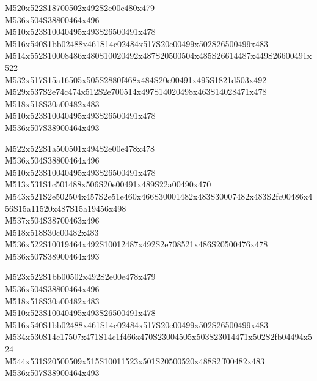 \documentclass{article}
\begin{document}
\begin{multicols}{5}
\begin{center}

M520x522S18700502x492S2e00e480x479 %
\\M536x504S38800464x496 %
\\M510x523S10040495x493S26500491x478 %
\\M516x540S1bb02488x461S14c02484x517S20e00499x502S26500499x483 %
\\M514x552S10008486x480S10020492x487S20500504x485S26614487x449S26600491x522 %
\\M532x517S15a16505x505S2880f468x484S20e00491x495S1821d503x492 %
\\M529x537S2e74c474x512S2e700514x497S14020498x463S14028471x478 %
\\M518x518S30a00482x483 %
\\M510x523S10040495x493S26500491x478 %
\\M536x507S38900464x493 %
\vfil
\columnbreak

M522x522S1a500501x494S2e00e478x478 %
\\M536x504S38800464x496 %
\\M510x523S10040495x493S26500491x478 %
\\M513x531S1c501488x506S20e00491x489S22a00490x470 %
\\M543x521S2e502504x457S2e51e460x466S30001482x483S30007482x483S2fc00486x456S15a11520x487S15a19456x498 %
\\M537x504S38700463x496 %
\\M518x518S30c00482x483 %
\\M536x522S10019464x492S10012487x492S2e708521x486S20500476x478 %
\\M536x507S38900464x493 %
\vfil
\columnbreak

M523x522S1bb00502x492S2e00e478x479 %
\\M536x504S38800464x496 %
\\M518x518S30a00482x483 %
\\M510x523S10040495x493S26500491x478 %
\\M516x540S1bb02488x461S14c02484x517S20e00499x502S26500499x483 %
\\M534x530S14c17507x471S14c1f466x470S23004505x503S23014471x502S2fb04494x524 %
\\M544x531S20500509x515S10011523x501S20500520x488S2ff00482x483 %
\\M536x507S38900464x493 %
\vfil
\columnbreak


\end{center}
\end{multicols}
\end{document}

